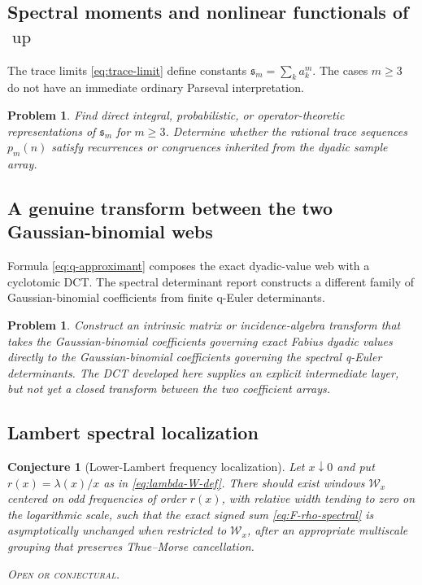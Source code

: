 \documentclass[11pt,oneside]{article}
\newtheorem{conjecture}[theorem]{Conjecture}
\newtheorem{problem}[theorem]{Problem}
\theoremstyle{definition}
\theoremstyle{remark}
\newcommand{\Up}{\operatorname{up}}
\newcommand{\openstatus}{\textcolor{conjectureorange}{\textsc{Open or conjectural.}}}
\begin{document}
\subsection{Spectral moments and nonlinear functionals of \texorpdfstring{$\Up$}{up}}

The trace limits \eqref{eq:trace-limit} define constants
$\mathfrak s_m=\sum_ka_k^m$.  The cases $m\ge3$ do not have an immediate
ordinary Parseval interpretation.

\begin{problem}\label{prob:nonlinear-traces}
Find direct integral, probabilistic, or operator-theoretic representations of
$\mathfrak s_m$ for $m\ge3$.  Determine whether the rational trace sequences
$p_m(n)$ satisfy recurrences or congruences inherited from the dyadic sample
array.
\end{problem}

\subsection{A genuine transform between the two Gaussian-binomial webs}

Formula \eqref{eq:q-approximant} composes the exact dyadic-value web with a
cyclotomic DCT.  The spectral determinant report constructs a different family
of Gaussian-binomial coefficients from finite q-Euler determinants.

\begin{problem}\label{prob:two-q-webs}
Construct an intrinsic matrix or incidence-algebra transform that takes the
Gaussian-binomial coefficients governing exact Fabius dyadic values directly
to the Gaussian-binomial coefficients governing the spectral q-Euler
determinants.  The DCT developed here supplies an explicit intermediate layer,
but not yet a closed transform between the two coefficient arrays.
\end{problem}

\subsection{Lambert spectral localization}

\begin{conjecture}[Lower-Lambert frequency localization]\label{conj:Lambert-localization}
Let $x\downarrow0$ and put $r(x)=\lambda(x)/x$ as in
\eqref{eq:lambda-W-def}.  There should exist windows
$\mathcal W_x$ centered on odd frequencies of order $r(x)$, with relative width
tending to zero on the logarithmic scale, such that the exact signed sum
\eqref{eq:F-rho-spectral} is asymptotically unchanged when restricted to
$\mathcal W_x$, after an appropriate multiscale grouping that preserves
Thue--Morse cancellation.

\smallskip\noindent\openstatus
\end{conjecture}
\end{document}
